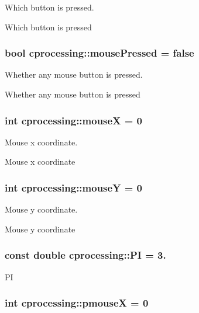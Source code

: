 \-Which button is pressed. 

\-Which button is pressed \hypertarget{namespacecprocessing_a02981e7550d1c27e3ae792450172f4b7}{
\subsubsection[{mouse\-Pressed}]{\setlength{\rightskip}{0pt plus 5cm}bool {\bf cprocessing\-::mouse\-Pressed} = false}}\label{namespacecprocessing_a02981e7550d1c27e3ae792450172f4b7}


\-Whether any mouse button is pressed. 

\-Whether any mouse button is pressed \hypertarget{namespacecprocessing_aca55645dc8d20d72de21bc8cf2c5bcd0}{
\subsubsection[{mouse\-X}]{\setlength{\rightskip}{0pt plus 5cm}int {\bf cprocessing\-::mouse\-X} = 0}}\label{namespacecprocessing_aca55645dc8d20d72de21bc8cf2c5bcd0}


\-Mouse x coordinate. 

\-Mouse x coordinate \hypertarget{namespacecprocessing_ac81e2d0a39a3d606e9e6d870e31534ee}{
\subsubsection[{mouse\-Y}]{\setlength{\rightskip}{0pt plus 5cm}int {\bf cprocessing\-::mouse\-Y} = 0}}\label{namespacecprocessing_ac81e2d0a39a3d606e9e6d870e31534ee}


\-Mouse y coordinate. 

\-Mouse y coordinate \hypertarget{namespacecprocessing_a445521f2b665e4744680faa4a6806676}{
\subsubsection[{\-P\-I}]{\setlength{\rightskip}{0pt plus 5cm}const double {\bf cprocessing\-::\-P\-I} = 3.}}\label{namespacecprocessing_a445521f2b665e4744680faa4a6806676}
\-P\-I \hypertarget{namespacecprocessing_afa6d39daa03165222e3c969b1ce26571}{
\subsubsection[{pmouse\-X}]{\setlength{\rightskip}{0pt plus 5cm}int {\bf cprocessing\-::pmouse\-X} = 0}}\label{namespacecprocessing_afa6d39daa03165222e3c969b1ce26571}


